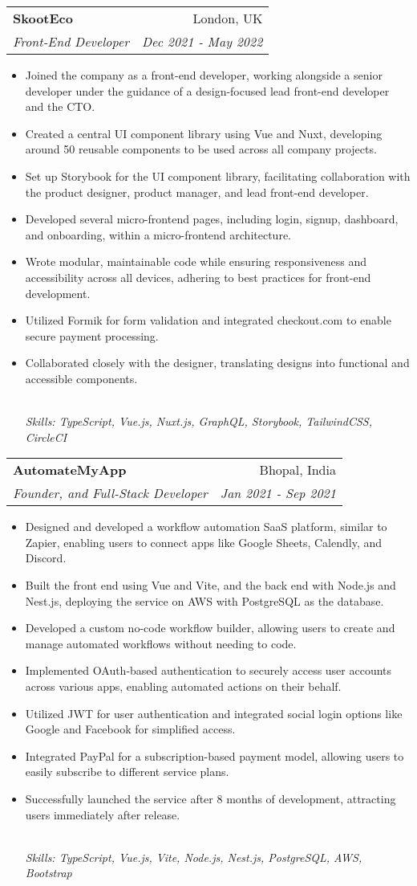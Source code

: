 \documentclass[letterpaper,12pt]{article}
\makeatletter
\newcommand{\resumeItem}[1]{
  \item\small{#1}\vspace{-2pt}
}
\newcommand{\resumeSubheading}[4]{
  \vspace{-2pt}\item
    \begin{tabular*}{0.97\textwidth}[t]{l@{\extracolsep{\fill}}r}
      \textbf{#1} & \small{#2} \\
      \textit{\small{#3}} & \textit{\small{#4}} \\
    \end{tabular*}\vspace{-5pt}
}
\newcommand{\resumeItemFooter}[1]{
    \\ \vspace{7pt}\hspace{-0.35in}\footnotesize\emph{#1}
}
\newcommand{\resumeItemListStart}{\begin{itemize}}
\newcommand{\resumeItemListEnd}{\end{itemize}\vspace{-5pt}}
\def\myHometown{Bhopal, India}
\makeatother
\begin{document}
\resumeSubheading
{SkootEco}{London, UK}
{Front-End Developer}{Dec 2021 - May 2022}
\resumeItemListStart
\resumeItem{Joined the company as a front-end developer, working alongside a senior developer under the guidance of a design-focused lead front-end developer and the CTO.}
\resumeItem{Created a central UI component library using Vue and Nuxt, developing around 50 reusable components to be used across all company projects.}
\resumeItem{Set up Storybook for the UI component library, facilitating collaboration with the product designer, product manager, and lead front-end developer.}
\resumeItem{Developed several micro-frontend pages, including login, signup, dashboard, and onboarding, within a micro-frontend architecture.}
\resumeItem{Wrote modular, maintainable code while ensuring responsiveness and accessibility across all devices, adhering to best practices for front-end development.}
\resumeItem{Utilized Formik for form validation and integrated checkout.com to enable secure payment processing.}
\resumeItem{Collaborated closely with the designer, translating designs into functional and accessible components.}
\resumeItemFooter{Skills: TypeScript, Vue.js, Nuxt.js, GraphQL, Storybook, TailwindCSS, CircleCI}
\resumeItemListEnd

\resumeSubheading
{AutomateMyApp}{\myHometown}
{Founder, and Full-Stack Developer}{Jan 2021 - Sep 2021}
\resumeItemListStart
\resumeItem{Designed and developed a workflow automation SaaS platform, similar to Zapier, enabling users to connect apps like Google Sheets, Calendly, and Discord.}
\resumeItem{Built the front end using Vue and Vite, and the back end with Node.js and Nest.js, deploying the service on AWS with PostgreSQL as the database.}
\resumeItem{Developed a custom no-code workflow builder, allowing users to create and manage automated workflows without needing to code.}
\resumeItem{Implemented OAuth-based authentication to securely access user accounts across various apps, enabling automated actions on their behalf.}
\resumeItem{Utilized JWT for user authentication and integrated social login options like Google and Facebook for simplified access.}
\resumeItem{Integrated PayPal for a subscription-based payment model, allowing users to easily subscribe to different service plans.}
\resumeItem{Successfully launched the service after 8 months of development, attracting users immediately after release.}
\resumeItemFooter{Skills: TypeScript, Vue.js, Vite, Node.js, Nest.js, PostgreSQL, AWS, Bootstrap}
\resumeItemListEnd
\end{document}
